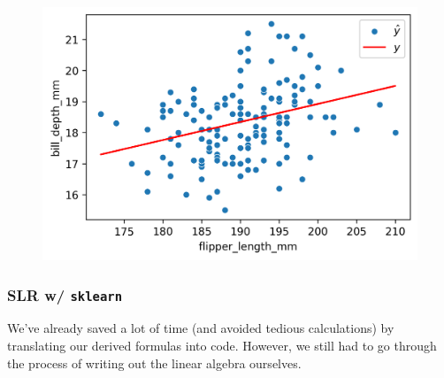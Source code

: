 \documentclass[
  letterpaper,
  DIV=11,
  numbers=noendperiod]{scrreprt}
\newenvironment{Shaded}{\begin{snugshade}}{\end{snugshade}}
\newcommand{\CommentTok}[1]{\textcolor[rgb]{0.37,0.37,0.37}{#1}}
\newcommand{\NormalTok}[1]{\textcolor[rgb]{0.00,0.23,0.31}{#1}}
\newcommand{\OperatorTok}[1]{\textcolor[rgb]{0.37,0.37,0.37}{#1}}
\newcommand{\SpecialCharTok}[1]{\textcolor[rgb]{0.37,0.37,0.37}{#1}}
\newcommand{\StringTok}[1]{\textcolor[rgb]{0.13,0.47,0.30}{#1}}
\newcommand{\VerbatimStringTok}[1]{\textcolor[rgb]{0.13,0.47,0.30}{#1}}
\begin{document}
\begin{Shaded}
\end{Shaded}

\begin{figure}[H]

{\centering \includegraphics{gradient_descent/gradient_descent_files/figure-pdf/cell-7-output-1.png}

}

\end{figure}

\hypertarget{slr-w-sklearn}{%
\subsubsection{\texorpdfstring{SLR w/
\texttt{sklearn}}{SLR w/ sklearn}}\label{slr-w-sklearn}}

We've already saved a lot of time (and avoided tedious calculations) by
translating our derived formulas into code. However, we still had to go
through the process of writing out the linear algebra ourselves.
\end{document}
